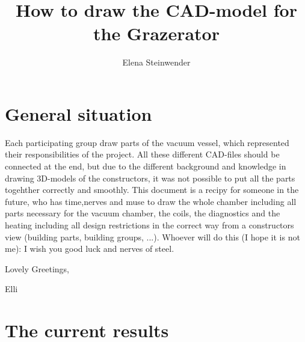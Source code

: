 \documentclass{article}
\title{How to draw the CAD-model for the Grazerator}
\author{Elena Steinwender}
\begin{document}
\maketitle
\newpage

\section{General situation}

Each participating group draw parts of the vacuum vessel, which represented their responsibilities of the project.
All these different CAD-files should be connected at the end, but due to the different background and knowledge in drawing 3D-models of the constructors, it was not possible to put all the parts togehther correctly and smoothly.
This document is a recipy for someone in the future, who has time,nerves and muse to draw the whole chamber including all parts necessary for the vacuum chamber, the coils, the diagnostics and the heating including all design restrictions in the correct way from a constructors view (building parts, building groups, ...).
Whoever will do this (I hope it is not me): I wish you good luck and nerves of steel.

Lovely Greetings,

Elli

\newpage

\section{The current results}

\begin{figure}

\end{figure}
\end{document}
